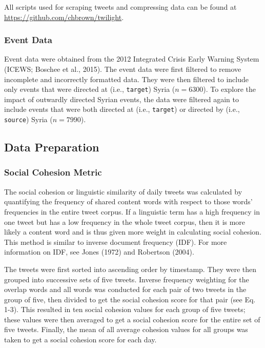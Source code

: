 \documentclass[
  english,
  man]{apa6}
\begin{document}
All scripts used for scraping tweets and compressing data can be found at
\url{https://github.com/chbrown/twilight}.

\hypertarget{event-data}{%
\subsubsection{Event Data}\label{event-data}}

Event data were obtained from the 2012 Integrated Crisis Early Warning System
(ICEWS; Boschee et al., 2015). The event data were first filtered to remove
incomplete and incorrectly formatted data. They were then filtered to include
only events that were directed at (i.e., \texttt{target}) Syria (\(n = 6300\)). To
explore the impact of outwardly directed Syrian events, the data were filtered
again to include events that were both directed at (i.e., \texttt{target}) or directed
by (i.e., \texttt{source}) Syria (\(n = 7990\)).

\hypertarget{data-preparation}{%
\subsection{Data Preparation}\label{data-preparation}}

\hypertarget{social-cohesion-metric}{%
\subsubsection{Social Cohesion Metric}\label{social-cohesion-metric}}

The social cohesion or linguistic similarity of daily tweets was calculated by
quantifying the frequency of shared content words with respect to those words'
frequencies in the entire tweet corpus. If a linguistic term has a high
frequency in one tweet but has a low frequency in the whole tweet corpus, then
it is more likely a content word and is thus given more weight in calculating
social cohesion. This method is similar to inverse document frequency (IDF). For
more information on IDF, see Jones (1972) and
Robertson (2004).

The tweets were first sorted into ascending order by timestamp. They were then
grouped into successive sets of five tweets. Inverse frequency weighting for the
overlap words and all words was conducted for each pair of two tweets in the
group of five, then divided to get the social cohesion score for that pair (see
Eq. 1-3). This resulted in ten social cohesion values for each group of five
tweets; these values were then averaged to get a social cohesion score for the
entire set of five tweets. Finally, the mean of all average cohesion values for
all groups was taken to get a social cohesion score for each day.
\end{document}
